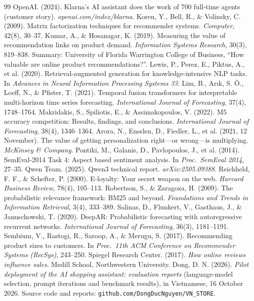 \documentclass[11pt,a4paper,oneside]{extreport}
\begin{document}
\begin{thebibliography}{99}
{ OpenAI. (2024). Klarna's AI assistant does the work of 700 full-time agents (customer story). \emph{openai.com/index/klarna}.
 Koren, Y., Bell, R., \& Volinsky, C. (2009). Matrix factorization techniques for recommender systems. \emph{Computer}, 42(8), 30--37.
 Kumar, A., \& Hosanagar, K. (2019). Measuring the value of recommendation links on product demand. \emph{Information Systems Research}, 30(3), 819--838. Summary: University of Florida Warrington College of Business, ``How valuable are online product recommendations?''.
 Lewis, P., Perez, E., Piktus, A., et al. (2020). Retrieval-augmented generation for knowledge-intensive NLP tasks. In \emph{Advances in Neural Information Processing Systems 33}.
 Lim, B., Ar{\i}k, S. \"O., Loeff, N., \& Pfister, T. (2021). Temporal fusion transformers for interpretable multi-horizon time series forecasting. \emph{International Journal of Forecasting}, 37(4), 1748--1764.
 Makridakis, S., Spiliotis, E., \& Assimakopoulos, V. (2022). M5 accuracy competition: Results, findings, and conclusions. \emph{International Journal of Forecasting}, 38(4), 1346--1364.
 Arora, N., Ensslen, D., Fiedler, L., et al. (2021, 12 November). The value of getting personalization right---or wrong---is multiplying. \emph{McKinsey \& Company}.
 Pontiki, M., Galanis, D., Pavlopoulos, J., et al. (2014). SemEval-2014 Task 4: Aspect based sentiment analysis. In \emph{Proc.\ SemEval 2014}, 27--35.
 Qwen Team. (2025). Qwen3 technical report. \emph{arXiv:2505.09388}.
 Reichheld, F. F., \& Schefter, P. (2000). E-loyalty: Your secret weapon on the web. \emph{Harvard Business Review}, 78(4), 105--113.
 Robertson, S., \& Zaragoza, H. (2009). The probabilistic relevance framework: BM25 and beyond. \emph{Foundations and Trends in Information Retrieval}, 3(4), 333--389.
 Salinas, D., Flunkert, V., Gasthaus, J., \& Januschowski, T. (2020). DeepAR: Probabilistic forecasting with autoregressive recurrent networks. \emph{International Journal of Forecasting}, 36(3), 1181--1191.
 Sembium, V., Rastogi, R., Saroop, A., \& Merugu, S. (2017). Recommending product sizes to customers. In \emph{Proc.\ 11th ACM Conference on Recommender Systems (RecSys)}, 243--250.
 Spiegel Research Center. (2017). \emph{How online reviews influence sales}. Medill School, Northwestern University.
 Dong, D. N. (2026). \emph{Pilot deployment of the AI shopping assistant: evaluation reports} (language-model selection, prompt iterations and benchmark results), in Vietnamese, 16 October 2026. Source code and reports: \texttt{github.com/DongDucNguyen/VN\_STORE}.
}
\end{thebibliography}
\end{document}
